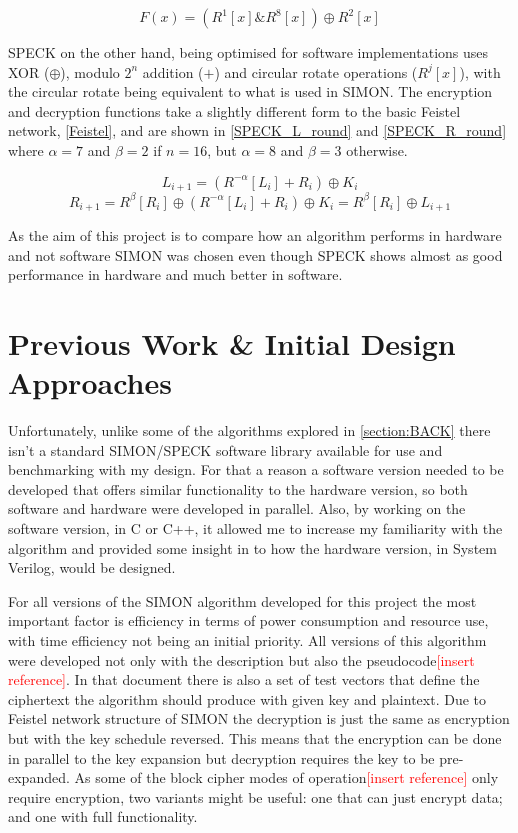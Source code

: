 \documentclass[12pt,twoside,a4paper]{report}
\begin{document}
	\begin{equation}
	\label{SIMON_round}
	F(x) = (R^1[x]\&R^8[x]) \oplus R^2[x]
	\end{equation}
    
	SPECK on the other hand, being optimised for software implementations uses XOR ($\oplus$), modulo $2^n$ addition ($+$) and circular rotate operations ($R^j[x]$), with the circular rotate being equivalent to what is used in SIMON. The encryption and decryption functions take a slightly different form to the basic Feistel network, \autoref{Feistel}, and are shown in \autoref{SPECK_L_round} and \ref{SPECK_R_round} where $\alpha = 7$ and $\beta = 2$ if $n = 16$, but $\alpha = 8$ and $\beta = 3$ otherwise.
    
	\begin{equation}
	\label{SPECK_L_round}
	L_{i+1} = (R^{-\alpha}[L_i] + R_i) \oplus K_i
	\end{equation}
	\begin{equation}
	\label{SPECK_R_round}
	R_{i+1} = R^{\beta}[R_i] \oplus (R^{-\alpha}[L_i] + R_i) \oplus K_i = R^{\beta}[R_i] \oplus L_{i+1}
	\end{equation}
	
	As the aim of this project is to compare how an algorithm performs in hardware and not software SIMON was chosen even though SPECK shows almost as good performance in hardware and much better in software. 
    
	\chapter{Previous Work \& Initial Design Approaches}
	\label{chapter:INITIAL}
	Unfortunately, unlike some of the algorithms explored in \autoref{section:BACK} there isn't a standard SIMON/SPECK software library available for use and benchmarking with my design. For that a reason a software version needed to be developed that offers similar functionality to the hardware version, so both software and hardware were developed in parallel. Also, by working on the software version, in C or C++, it allowed me to increase my familiarity with the algorithm and provided some insight in to how the hardware version, in System Verilog, would be designed.
    
	For all versions of the SIMON algorithm developed for this project the most important factor is efficiency in terms of power consumption and resource use, with time efficiency not being an initial priority. All versions of this algorithm were developed not only with the description but also the pseudocode\textcolor{red}{[insert reference]}. In that document there is also a set of test vectors that define the ciphertext the algorithm should produce with given key and plaintext. Due to Feistel network structure of SIMON the decryption is just the same as encryption but with the key schedule reversed. This means that the encryption can be done in parallel to the key expansion but decryption requires the key to be pre-expanded. As some of the block cipher modes of operation\textcolor{red}{[insert reference]} only require encryption, two variants might be useful: one that can just encrypt data; and one with full functionality.
    
\end{document}
